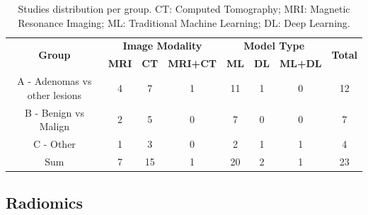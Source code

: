 \documentclass{article}
\begin{document}
\begin{table}[]
    \centering
    \begin{tabular}{cccccccc}\toprule
        \multirow{2}{*}{\textbf{Group}} & \multicolumn{3}{c}{\textbf{Image Modality}} & \multicolumn{3}{c}{\textbf{Model Type}} & \multirow{2}{*}{\textbf{Total}}
        \\\cmidrule(lr){2-4} \cmidrule(lr){5-7}
                                        & \textbf{MRI}                                & \textbf{CT}                             & \textbf{MRI+CT}                 & \textbf{ML} & \textbf{DL} & \textbf{ML+DL}      \\\midrule
        A - Adenomas vs other lesions   & 4                                           & 7                                       & 1                               & 11          & 1           & 0              & 12 \\
        B - Benign vs Malign            & 2                                           & 5                                       & 0                               & 7           & 0           & 0              & 7  \\
        C - Other                       & 1                                           & 3                                       & 0                               & 2           & 1           & 1              & 4  \\
        Sum                             & 7                                           & 15                                      & 1                               & 20          & 2           & 1              & 23 \\
        \bottomrule
    \end{tabular}
    \caption{Studies distribution per group. CT: Computed Tomography; MRI: Magnetic Resonance Imaging; ML: Traditional Machine Learning; DL: Deep Learning.}
    \label{tab:sota_sum}
\end{table}

\subsection{Radiomics}
\end{document}
